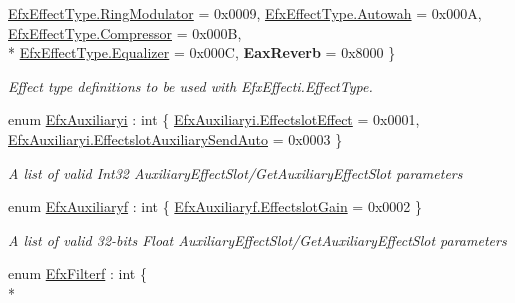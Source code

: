 \begin{DoxyCompactItemize}
\hyperlink{namespace_open_t_k_1_1_audio_1_1_open_a_l_a224be2a7f650eba92828d53342bfbc30a1a2d8f76f78888ac2614a30b56fb2411}{Efx\-Effect\-Type.\-Ring\-Modulator} = 0x0009, 
\hyperlink{namespace_open_t_k_1_1_audio_1_1_open_a_l_a224be2a7f650eba92828d53342bfbc30a3fd535df42921e0421e809498f46cc3d}{Efx\-Effect\-Type.\-Autowah} = 0x000\-A, 
\hyperlink{namespace_open_t_k_1_1_audio_1_1_open_a_l_a224be2a7f650eba92828d53342bfbc30aeeb612b01877f2490f950420f36b102e}{Efx\-Effect\-Type.\-Compressor} = 0x000\-B, 
\\*
\hyperlink{namespace_open_t_k_1_1_audio_1_1_open_a_l_a224be2a7f650eba92828d53342bfbc30ab9fb964f2edf7245f6c0eb6ea5562c82}{Efx\-Effect\-Type.\-Equalizer} = 0x000\-C, 
{\bfseries Eax\-Reverb} = 0x8000
 \}
\begin{DoxyCompactList}\small\item\em Effect type definitions to be used with Efx\-Effecti.\-Effect\-Type.\end{DoxyCompactList}\item 
enum \hyperlink{namespace_open_t_k_1_1_audio_1_1_open_a_l_a94243a598006983d92449b374a5b60cc}{Efx\-Auxiliaryi} \-: int \{ \hyperlink{namespace_open_t_k_1_1_audio_1_1_open_a_l_a94243a598006983d92449b374a5b60cca5c7490bcd2d8c9434c85a3d3c6eb8600}{Efx\-Auxiliaryi.\-Effectslot\-Effect} = 0x0001, 
\hyperlink{namespace_open_t_k_1_1_audio_1_1_open_a_l_a94243a598006983d92449b374a5b60cca02f02571c0ee8d3081054750a54ea98d}{Efx\-Auxiliaryi.\-Effectslot\-Auxiliary\-Send\-Auto} = 0x0003
 \}
\begin{DoxyCompactList}\small\item\em A list of valid Int32 Auxiliary\-Effect\-Slot/\-Get\-Auxiliary\-Effect\-Slot parameters\end{DoxyCompactList}\item 
enum \hyperlink{namespace_open_t_k_1_1_audio_1_1_open_a_l_ad4eb76e6214aa11619cd342b8ab6acbd}{Efx\-Auxiliaryf} \-: int \{ \hyperlink{namespace_open_t_k_1_1_audio_1_1_open_a_l_ad4eb76e6214aa11619cd342b8ab6acbda31307eed4df997d51d0b9e7a03ab4d57}{Efx\-Auxiliaryf.\-Effectslot\-Gain} = 0x0002
 \}
\begin{DoxyCompactList}\small\item\em A list of valid 32-\/bits Float Auxiliary\-Effect\-Slot/\-Get\-Auxiliary\-Effect\-Slot parameters\end{DoxyCompactList}\item 
enum \hyperlink{namespace_open_t_k_1_1_audio_1_1_open_a_l_a6a389aa5e465025fe4eb3fba1603fd6b}{Efx\-Filterf} \-: int \{ \\*

\end{DoxyCompactItemize}
